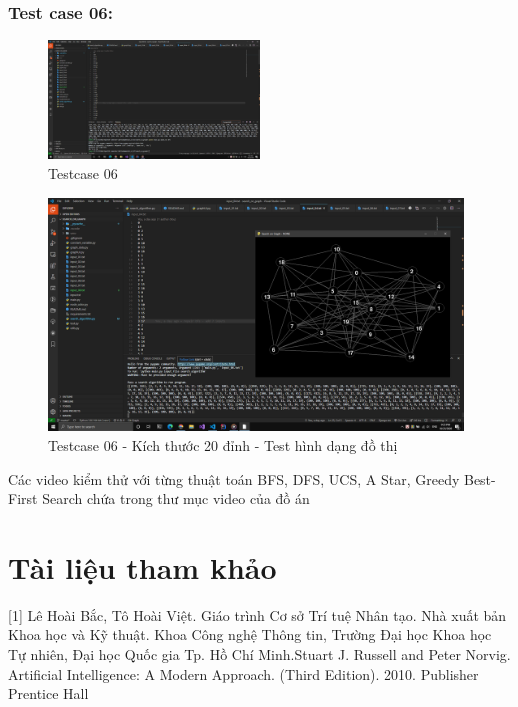 \documentclass{article}
\begin{document}
\subsubsection{Test case 06:}
\begin{figure}[H]
\centering
\includegraphics[width=0.5\textwidth]{Test_Case_06.png}
\caption{Testcase 06}
\end{figure}
\begin{figure}[H]
\centering
\includegraphics[width=0.98\textwidth]{Test_Case_06_Content.png}
\caption{Testcase 06 - Kích thước 20 đỉnh - Test hình dạng đồ thị}
\end{figure}

Các video kiểm thử với từng thuật toán BFS, DFS, UCS, A Star, Greedy Best-First Search chứa trong thư mục video của đồ án

\newpage

\section{Tài liệu tham khảo}
[1] Lê Hoài Bắc, Tô Hoài Việt. Giáo trình Cơ sở Trí tuệ Nhân tạo. Nhà xuất bản Khoa học và Kỹ thuật. Khoa Công nghệ Thông tin, Trường Đại học Khoa học Tự nhiên, Đại học Quốc gia Tp. Hồ Chí Minh.\newline
[2] Stuart J. Russell and Peter Norvig. Artificial Intelligence: A Modern Approach. (Third Edition). 2010. Publisher Prentice Hall
\newpage
\end{document}
